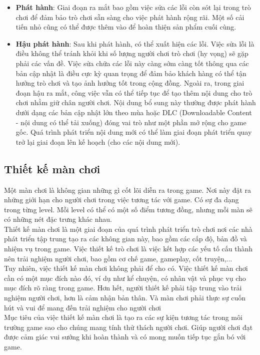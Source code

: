 \begin{itemize}
	\item \textbf{Phát hành}: Giai đoạn ra mắt bao gồm việc sửa các lỗi còn sót lại trong trò chơi để đảm bảo trò chơi sẵn sàng cho việc phát hành rộng rãi. Một số cải tiến nhỏ cũng có thể được thêm vào để hoàn thiện sản phẩm cuối cùng.
	\item \textbf{Hậu phát hành}: Sau khi phát hành, có thể xuất hiện các lỗi. Việc sửa lỗi là điều không thể tránh khỏi khi số lượng người chơi trò chơi (hy vọng) sẽ gặp phải các vấn đề. Việc sửa chữa các lỗi này càng sớm càng tốt thông qua các bản cập nhật là điều cực kỳ quan trọng để đảm bảo khách hàng có thể tận hưởng trò chơi và tạo ảnh hưởng tốt trong cộng đồng. Ngoài ra, trong giai đoạn hậu ra mắt, công việc vẫn có thể tiếp tục để tạo thêm nội dung cho trò chơi nhằm giữ chân người chơi. Nội dung bổ sung này thường được phát hành dưới dạng các bản cập nhật lớn theo mùa hoặc DLC (Downloadable Content - nội dung có thể tải xuống) đóng vai trò như một phần mở rộng cho game gốc. Quá trình phát triển nội dung mới có thể làm giai đoạn phát triển quay trở lại giai đoạn lên kế hoạch (cho các nội dung mới).
\end{itemize}
\subsection{Thiết kế màn chơi}
\hspace*{0.5cm} Một màn chơi là không gian những gì cốt lõi diễn ra trong game. Nơi này đặt ra những giới hạn cho người chơi trong việc tương tác với game. Có sự đa dạng trong từng level. Mỗi level có thể có một số điểm tương đồng, nhưng mỗi màn sẽ có những nét đặc trưng khác nhau.\\
\hspace*{0.5cm} Thiết kế màn chơi là một giai đoạn của quá trình phát triển trò chơi nơi các nhà phát triển tập trung tạo ra các không gian này, bao gồm các cấp độ, bản đồ và nhiệm vụ trong game. Việc thiết kế trò chơi là việc kết hợp các yếu tố cấu thành nên trải nghiệm người chơi, bao gồm cơ chế game, gameplay, cốt truyện,...\\
\hspace*{0.5cm} Tuy nhiên, việc thiết kế màn chơi không phải để cho có. Việc thiết kế màn chơi cần có một mục đích nào đó, ví dụ như kể chuyện, có nhân vật và phục vụ cho mục đích rõ ràng trong game. Hơn hết, người thiết kế phải tập trung vào trải nghiệm người chơi, hơn là cảm nhận bản thân. Và màn chơi phải thực sự cuốn hút và vui để mang đến trải nghiệm cho người chơi\\
\hspace*{0.5cm} Mục tiêu của việc thiết kế màn chơi là tạo ra các sự kiện tương tác trong môi trường game sao cho chúng mang tính thử thách người chơi. Giúp người chơi đạt được cảm giác vui sướng khi hoàn thành và có mong muốn tiếp tục gắn bó với game.\\
